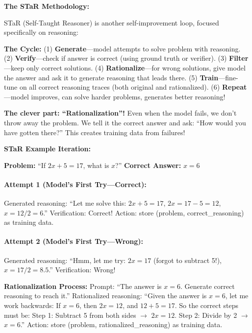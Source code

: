 \begin{chapterenv}
\begin{infobox}
\textbf{The STaR Methodology:}

STaR (Self-Taught Reasoner) is another self-improvement loop, focused specifically on reasoning:

\textbf{The Cycle:} (1) \textbf{Generate}---model attempts to solve problem with reasoning. (2) \textbf{Verify}---check if answer is correct (using ground truth or verifier). (3) \textbf{Filter}---keep only correct solutions. (4) \textbf{Rationalize}---for wrong solutions, give model the answer and ask it to generate reasoning that leads there. (5) \textbf{Train}---fine-tune on all correct reasoning traces (both original and rationalized). (6) \textbf{Repeat}---model improves, can solve harder problems, generates better reasoning!

\textbf{The clever part: ``Rationalization''!} Even when the model fails, we don't throw away the problem. We tell it the correct answer and ask: ``How would you have gotten there?'' This creates training data from failures!
\end{infobox}

\textbf{STaR Example Iteration:}

\textbf{Problem:} ``If $2x + 5 = 17$, what is $x$?'' \textbf{Correct Answer:} $x = 6$

\paragraph{Attempt 1 (Model's First Try---Correct):}

Generated reasoning: ``Let me solve this: $2x + 5 = 17$, $2x = 17 - 5 = 12$, $x = 12/2 = 6$.'' Verification: Correct! Action: store (problem, correct\_reasoning) as training data.

\paragraph{Attempt 2 (Model's First Try---Wrong):}

Generated reasoning: ``Hmm, let me try: $2x = 17$ (forgot to subtract 5!), $x = 17/2 = 8.5$.'' Verification: Wrong!

\textbf{Rationalization Process:} Prompt: ``The answer is $x=6$. Generate correct reasoning to reach it.'' Rationalized reasoning: ``Given the answer is $x=6$, let me work backwards: If $x = 6$, then $2x = 12$, and $12 + 5 = 17$. So the correct steps must be: Step 1: Subtract 5 from both sides $\to$ $2x = 12$. Step 2: Divide by 2 $\to$ $x = 6$.'' Action: store (problem, rationalized\_reasoning) as training data.


\end{chapterenv}
